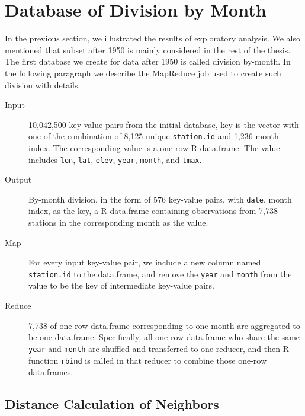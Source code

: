 \section{Database of Division by Month}

In the previous section, we illustrated the results of exploratory analysis. We 
also mentioned that subset after 1950 is mainly considered in the rest of the 
thesis. The first database we create for data after 1950 is called division 
by-month. In the following paragraph we describe the MapReduce job used to create 
such division with details.

\begin{description}
  \item[Input] 10,042,500 key-value pairs from the initial database, key is the
  vector with one of the combination of 8,125 unique \texttt{station.id} and  
  1,236 month index. The corresponding value is a one-row R data.frame. The value 
  includes \texttt{lon}, \texttt{lat}, \texttt{elev}, \texttt{year}, 
  \texttt{month}, and \texttt{tmax}.
  \item[Output] By-month division, in the form of 576 key-value pairs, with 
  \texttt{date}, month index, as the key, a R data.frame containing 
  observations from 7,738 stations in the corresponding month as the value.
  \item[Map]For every input key-value pair, we include a new column named 
  \texttt{station.id} to the data.frame, and remove the \texttt{year} and 
  \texttt{month} from the value to be the key of intermediate key-value pairs. 
  \item[Reduce] 7,738 of one-row data.frame corresponding to one month are 
  aggregated to be one data.frame. Specifically, all one-row data.frame who share
  the same \texttt{year} and \texttt{month} are shuffled and transferred to one 
  reducer, and then R function \texttt{rbind} is called in that reducer to combine 
  those one-row data.frames.
\end{description}

\subsection{Distance Calculation of Neighbors}

